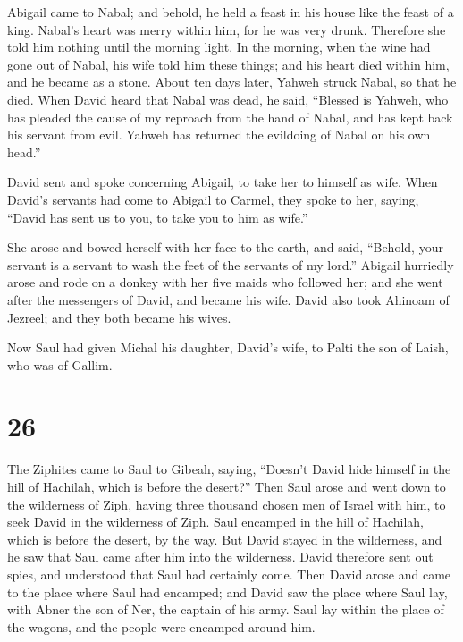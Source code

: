  Abigail came to Nabal; and behold, he held a feast in his
house like the feast of a king. Nabal's heart was merry within him, for
he was very drunk. Therefore she told him nothing until the morning
light.  In the morning, when the wine had gone out of
Nabal, his wife told him these things; and his heart died within him,
and he became as a stone.  About ten days later, Yahweh
struck Nabal, so that he died.  When David heard that Nabal
was dead, he said, ``Blessed is Yahweh, who has pleaded the cause of my
reproach from the hand of Nabal, and has kept back his servant from
evil. Yahweh has returned the evildoing of Nabal on his own head.''

David sent and spoke concerning Abigail, to take her to himself as wife.
 When David's servants had come to Abigail to Carmel, they
spoke to her, saying, ``David has sent us to you, to take you to him as
wife.''

 She arose and bowed herself with her face to the earth,
and said, ``Behold, your servant is a servant to wash the feet of the
servants of my lord.''  Abigail hurriedly arose and rode on
a donkey with her five maids who followed her; and she went after the
messengers of David, and became his wife.  David also took
Ahinoam of Jezreel; and they both became his wives.

 Now Saul had given Michal his daughter, David's wife, to
Palti the son of Laish, who was of Gallim.

\hypertarget{section-25}{%
\section{26}\label{section-25}}

 The Ziphites came to Saul to Gibeah, saying, ``Doesn't
David hide himself in the hill of Hachilah, which is before the
desert?''  Then Saul arose and went down to the wilderness
of Ziph, having three thousand chosen men of Israel with him, to seek
David in the wilderness of Ziph.  Saul encamped in the hill
of Hachilah, which is before the desert, by the way. But David stayed in
the wilderness, and he saw that Saul came after him into the wilderness.
 David therefore sent out spies, and understood that Saul
had certainly come.  Then David arose and came to the place
where Saul had encamped; and David saw the place where Saul lay, with
Abner the son of Ner, the captain of his army. Saul lay within the place
of the wagons, and the people were encamped around him.


